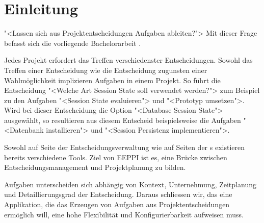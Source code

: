 \chapter{Einleitung}

	"<Lassen sich aus Projektentscheidungen Aufgaben ableiten?">
	Mit dieser Frage befasst sich die vorliegende Bachelorarbeit \eeppi.
		
	Jedes Projekt erfordert das Treffen verschiedenster Entscheidungen.
	Sowohl das Treffen einer Entscheidung wie die Entscheidung zugunsten einer Wahlmöglichkeit implizieren Aufgaben in einem Projekt.
	So führt die Entscheidung "<Welche Art Session State soll verwendet werden?"> zum Beispiel zu den Aufgaben
	"<Session State evaluieren"> und "<Prototyp umsetzen">.		
	Wird bei dieser Entscheidung die Option "<Database Session State"> ausgewählt,
	so resultieren aus diesem Entscheid beispielsweise die Aufgaben "<Datenbank installieren"> und
		"<Session Persistenz implementieren">.
	
	Sowohl auf Seite der Entscheidungsverwaltung wie auf Seiten der \ppt s existieren bereits verschiedene Tools.
	Ziel von EEPPI ist es, eine Brücke zwischen Entscheidungsmanagement und Projektplanung zu bilden.
	
	Aufgaben unterscheiden sich abhängig von Kontext, Unternehmung, Zeitplanung und Detaillierungsgrad der Entscheidung.
	Daraus schliessen wir, das eine Applikation, die das Erzeugen von Aufgaben aus Projektentscheidungen ermöglich will, eine hohe Flexibilität und Konfigurierbarkeit aufweisen muss.
	

